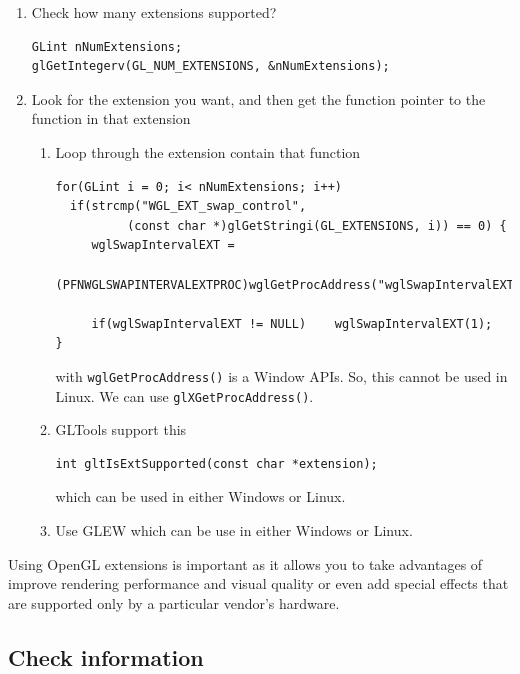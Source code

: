 \begin{enumerate}
\item Check how many extensions supported?
\begin{verbatim}
GLint nNumExtensions;
glGetIntegerv(GL_NUM_EXTENSIONS, &nNumExtensions);
\end{verbatim}

\item Look for the extension you want, and then get the function
  pointer to the function in that extension
  \begin{enumerate}
  \item Loop through the extension contain that function
\begin{verbatim}
for(GLint i = 0; i< nNumExtensions; i++)
  if(strcmp("WGL_EXT_swap_control", 
          (const char *)glGetStringi(GL_EXTENSIONS, i)) == 0) {
     wglSwapIntervalEXT =
         (PFNWGLSWAPINTERVALEXTPROC)wglGetProcAddress("wglSwapIntervalEXT");

     if(wglSwapIntervalEXT != NULL)    wglSwapIntervalEXT(1);
}

\end{verbatim}
    with \verb!wglGetProcAddress()! is a Window APIs. So, this cannot
    be used in Linux. We can use \verb!glXGetProcAddress()!. 
    
  \item GLTools support this
\begin{verbatim}
int gltIsExtSupported(const char *extension);
\end{verbatim}
which can be used in either Windows or Linux.

    \item Use GLEW which can be use in either Windows or Linux. 

\end{enumerate}

\end{enumerate}

\begin{framed}
  Using OpenGL extensions is important as it allows you to take
  advantages of improve rendering performance and visual quality or
  even add special effects that are supported only by a particular
  vendor's hardware.
\end{framed}


\subsection{Check information}
\label{sec:check-information}

